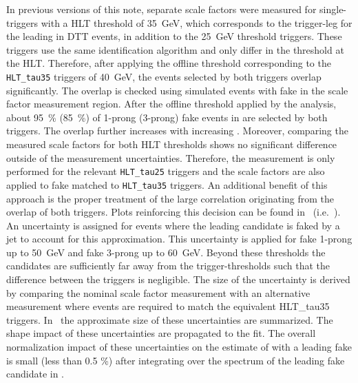 In previous versions of this note, separate scale factors were
measured for single-\tauhad triggers with a HLT \tauhad \pT threshold
of \SI{35}{\GeV}, which corresponds to the trigger-leg for the leading
\tauhad in DTT events, in addition to the \SI{25}{\GeV} threshold
triggers. These triggers use the same \tauhad identification algorithm
and only differ in the \tauhad \pT threshold at the HLT.  Therefore,
after applying the offline threshold corresponding to the
\verb|HLT_tau35| triggers of \SI{40}{\GeV}, the events selected by
both triggers overlap significantly. The overlap is checked using
simulated \ttbar events with fake \tauhad in the scale factor
measurement region. After the offline threshold applied by the
analysis, about \SI{95}{\percent} (\SI{85}{\percent}) of 1-prong
(3-prong) fake \tauhad events in \ttbar are selected by both
triggers. The overlap further increases with increasing \tauhad
\pT. Moreover, comparing the measured scale factors for both HLT
thresholds shows no significant difference outside of the measurement
uncertainties. Therefore, the measurement is only performed for the
relevant \verb|HLT_tau25| triggers and the scale factors are also
applied to fake \tauhad matched to \verb|HLT_tau35| triggers. An
additional benefit of this approach is the proper treatment of the
large correlation originating from the overlap of both triggers.
Plots reinforcing this decision can be found
in~ (i.e.\
). An
uncertainty is assigned for \ttbar events where the leading \tauhad
candidate is faked by a jet to account for this approximation. This
uncertainty is applied for fake 1-prong \tauhad up to \SI{50}{\GeV}
and fake 3-prong \tauhad up to \SI{60}{\GeV}. Beyond these thresholds
the \tauhad candidates are sufficiently far away from the
trigger-thresholds such that the difference between the triggers is
negligible. The size of the uncertainty is derived by comparing the
nominal scale factor measurement with an alternative measurement where
events are required to match the equivalent HLT\_tau35
triggers. In~ the
approximate size of these uncertainties are summarized. The shape
impact of these uncertainties are propagated to the fit. The overall
normalization impact of these uncertainties on the estimate of \ttbar
with a leading fake \tauhad is small (less than 0.5 \%) after
integrating over the \tauhad \pT spectrum of the leading fake \tauhad
candidate in \ttbar.

